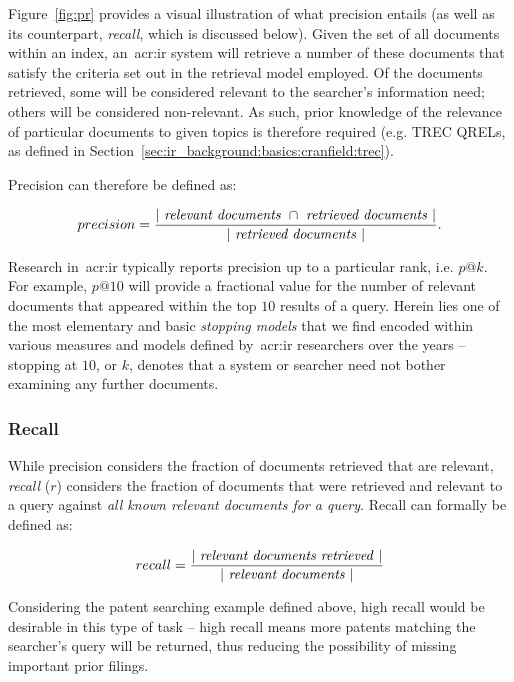 Figure~\ref{fig:pr} provides a visual illustration of what precision entails (as well as its counterpart, \emph{recall}, which is discussed below). Given the set of all documents within an index, an~\gls{acr:ir} system will retrieve a number of these documents that satisfy the criteria set out in the retrieval model employed. Of the documents retrieved, some will be considered relevant to the searcher's information need; others will be considered non-relevant. As such, prior knowledge of the relevance of particular documents to given topics is therefore required (e.g. TREC QRELs, as defined in Section~\ref{sec:ir_background:basics:cranfield:trec}).

Precision can therefore be defined as:

\begin{equation*}
precision = \frac{|~\text{\emph{relevant documents}}~\cap~\text{\emph{retrieved documents}}~|}{|~\text{\emph{retrieved documents}}~|}.
\end{equation*}

Research in~\gls{acr:ir} typically reports precision up to a particular rank, i.e. $p@k$. For example, $p@10$ will provide a fractional value for the number of relevant documents that appeared within the top $10$ results of a query. Herein lies one of the most elementary and basic \emph{stopping models} that we find encoded within various measures and models defined by~\gls{acr:ir} researchers over the years -- stopping at $10$, or $k$, denotes that a system or searcher need not bother examining any further documents.

\subsubsection{Recall}
While precision considers the fraction of documents retrieved that are relevant, \emph{recall} ($r$) considers the fraction of documents that were retrieved and relevant to a query against \emph{all known relevant documents for a query}. Recall can formally be defined as:

\begin{equation*}
recall = \frac{|~\text{\emph{relevant documents retrieved}}~|}{|~\text{\emph{relevant documents}}~|}
\end{equation*}

Considering the patent searching example defined above, high recall would be desirable in this type of task -- high recall means more patents matching the searcher's query will be returned, thus reducing the possibility of missing important prior filings.

